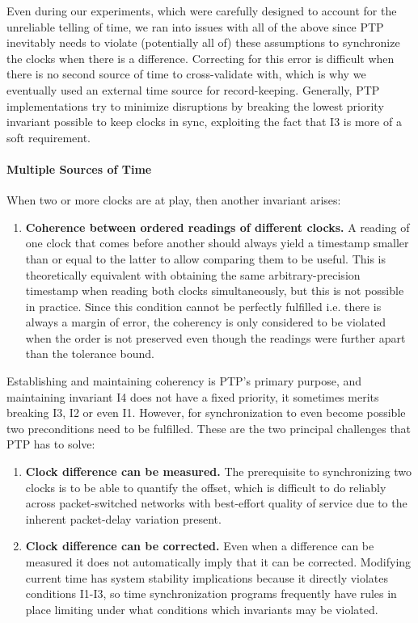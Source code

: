 Even during our experiments, which were carefully designed to account for the unreliable telling of time, we ran into issues with all of the above since PTP inevitably needs to violate (potentially all of) these assumptions to synchronize the clocks when there is a difference. Correcting for this error is difficult when there is no second source of time to cross-validate with, which is why we eventually used an external time source for record-keeping. Generally, PTP implementations try to minimize disruptions by breaking the lowest priority invariant possible to keep clocks in sync, exploiting the fact that I3 is more of a soft requirement.

\paragraph*{Multiple Sources of Time}

When two or more clocks are at play, then another invariant arises:

\begin{enumerate}[label=I\arabic*.]
    \setcounter{enumi}{\value{errorConditions}}
    \item \textbf{Coherence between ordered readings of different clocks.} A reading of one clock that comes before another should always yield a timestamp smaller than or equal to the latter to allow comparing them to be useful. This is theoretically equivalent with obtaining the same arbitrary-precision timestamp when reading both clocks simultaneously, but this is not possible in practice. Since this condition cannot be perfectly fulfilled i.e. there is always a margin of error, the coherency is only considered to be violated when the order is not preserved even though the readings were further apart than the tolerance bound.
\end{enumerate}

Establishing and maintaining coherency is PTP's primary purpose, and maintaining invariant I4 does not have a fixed priority, it sometimes merits breaking I3, I2 or even I1. However, for synchronization to even become possible two preconditions need to be fulfilled. These are the two principal challenges that PTP has to solve:

\begin{enumerate}[label=P\arabic*.]

    \item \textbf{Clock difference can be measured.} The prerequisite to synchronizing two clocks is to be able to quantify the offset, which is difficult to do reliably across packet-switched networks with best-effort quality of service due to the inherent packet-delay variation present.
    \item \textbf{Clock difference can be corrected.} Even when a difference can be measured it does not automatically imply that it can be corrected. Modifying current time has system stability implications because it directly violates conditions I1-I3, so time synchronization programs frequently have rules in place limiting under what conditions which invariants may be violated.
\end{enumerate}

